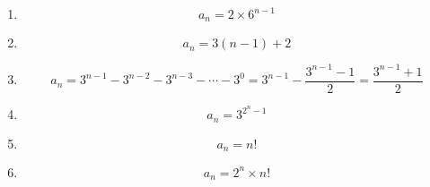 \p
\begin{enumerate}
\item
$$a_n = 2 \times 6^{n-1}$$
\item
$$a_n = 3(n-1) + 2$$
\item
$$a_n = 3^{n-1} - 3^{n-2} - 3^{n-3} - \cdots - 3^{0} = 3^{n-1} - \frac{3^{n-1}-1}{2} = \frac{3^{n-1}+1}{2}$$
\item
$$a_n = 3^{2^{n}-1}$$
\item
$$a_n = n!$$
\item
$$a_n = 2^{n} \times n!$$
\end{enumerate}